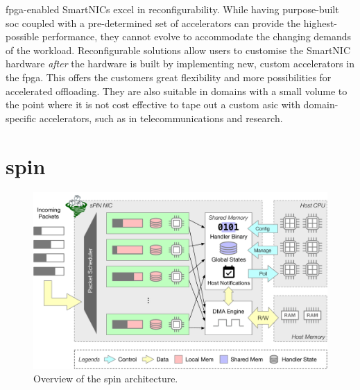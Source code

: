 \ac{fpga}-enabled SmartNICs excel in reconfigurability.  While having purpose-built \ac{soc} coupled with a pre-determined set of accelerators can provide the highest-possible performance, they cannot evolve to accommodate the changing demands of the workload.  Reconfigurable solutions allow users to customise the SmartNIC hardware \emph{after} the hardware is built by implementing new, custom accelerators in the \ac{fpga}.  This offers the customers great flexibility and more possibilities for accelerated offloading.  They are also suitable in domains with a small volume to the point where it is not cost effective to tape out a custom \ac{asic} with domain-specific accelerators, such as in telecommunications and research.

\section{\acs{spin}} \label{sec:background-spin}

\begin{figure}[tp]
    \centering
    \includegraphics[width=\textwidth]{thesis/figures/spin-arch.pdf}
    \caption{Overview of the \ac{spin} architecture.}
    \label{fig:spin-arch}
\end{figure}

